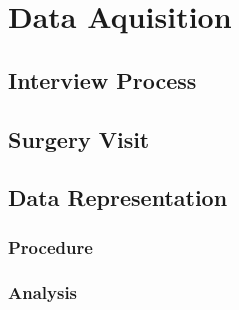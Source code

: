 \chapter{Data Aquisition}\label{dataaquisition} 

\section{Interview Process}
\section{Surgery Visit}
\section{Data Representation}
\subsection{Procedure}
\subsection{Analysis}